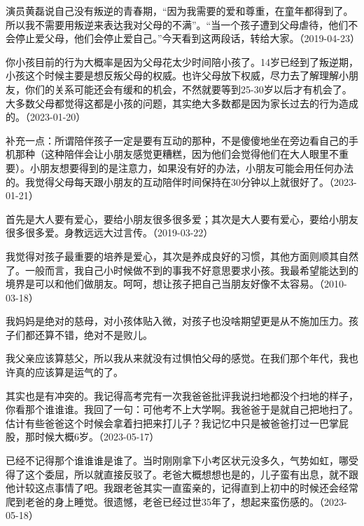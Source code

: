 演员黄磊说自己没有叛逆的青春期，“因为我需要的爱和尊重，在童年都得到了。所以我不需要用叛逆来表达我对父母的不满”。“当一个孩子遭到父母虐待，他们不会停止爱父母，他们会停止爱自己。”今天看到这两段话，转给大家。（2019-04-23）


你小孩目前的行为大概率是因为父母花太少时间陪小孩了。14岁已经到了叛逆期，小孩这个时候主要是想反叛父母的权威。也许父母放下权威，尽力去了解理解小朋友，你们的关系可能还会有缓和的机会，不然就要等到25-30岁以后才有机会了。大多数父母都觉得这都是小孩的问题，其实绝大多数都是因为家长过去的行为造成的。（2023-01-20）

补充一点：所谓陪伴孩子一定是要有互动的那种，不是傻傻地坐在旁边看自己的手机那种（这种陪伴会让小朋友感觉更糟糕，因为他们会觉得他们在大人眼里不重要）。小朋友想要得到的是注意力，如果没有好的办法，小朋友可能会用任何办法的。我觉得父母每天跟小朋友的互动陪伴时间保持在30分钟以上就很好了。（2023-01-21）


首先是大人要有爱心，要给小朋友很多很多爱；其次是大人要有爱心，要给小朋友很多很多爱。身教远远大过言传。（2019-03-22）


我觉得对孩子最重要的培养是爱心，其次是养成良好的习惯，其他方面则顺其自然了。一般而言，我自己小时候做不到的事我不好意思要求小孩。我最希望能达到的境界是可以和他们做朋友。呵呵，想让孩子把自己当朋友好像不太容易。（2010-03-18）

我妈妈是绝对的慈母，对小孩体贴入微，对孩子也没啥期望更是从不施加压力。孩子们都还算不错，绝对不是败儿。

我父亲应该算慈父，所以我从来就没有过惧怕父母的感觉。在我们那个年代，我也许真的应该算是运气的了。


其实也是有冲突的。我记得高考完有一次我爸爸批评我说扫地都没个扫地的样子，你看那个谁谁谁。我回了一句：可他考不上大学啊。我爸爸于是就自己把地扫了。估计有些爸爸这个时候会拿着扫把来打儿子？我记忆中只是被爸爸打过一巴掌屁股，那时候大概6岁。（2023-05-17）


已经不记得那个谁谁谁是谁了。当时刚刚拿下小考区状元没多久，气势如虹，哪受得了这个委屈，所以就直接反驳了。老爸大概想想也是的，儿子蛮有出息，就不跟他计较这点事情了吧。我跟老爸其实一直蛮亲的，记得直到上初中的时候还会经常爬到老爸的身上睡觉。很遗憾，老爸已经过世35年了，想起来蛮伤感的。（2023-05-18）

